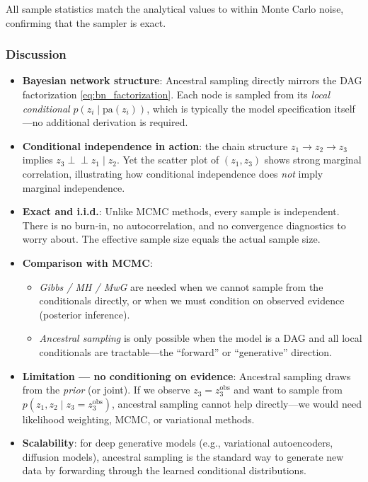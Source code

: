 \documentclass[12pt, a4paper]{article}
\begin{document}
All sample statistics match the analytical values to within
Monte Carlo noise, confirming that the sampler is exact.

\subsubsection{Discussion}

\begin{itemize}
    \item \textbf{Bayesian network structure}: Ancestral
          sampling directly mirrors the DAG factorization
          \eqref{eq:bn_factorization}.  Each node is sampled
          from its \emph{local conditional}
          $p(z_i \mid \mathrm{pa}(z_i))$, which is typically
          the model specification itself---no additional
          derivation is required.
    \item \textbf{Conditional independence in action}:
          the chain structure $z_1 \to z_2 \to z_3$ implies
          $z_3 \perp\!\!\perp z_1 \mid z_2$.  Yet the
          scatter plot of $(z_1, z_3)$ shows strong marginal
          correlation, illustrating how conditional independence
          does \emph{not} imply marginal independence.
    \item \textbf{Exact and i.i.d.}: Unlike MCMC methods,
          every sample is independent.  There is no burn-in,
          no autocorrelation, and no convergence diagnostics
          to worry about.  The effective sample size equals
          the actual sample size.
    \item \textbf{Comparison with MCMC}:
          \begin{itemize}
              \item \emph{Gibbs / MH / MwG} are needed when we
                    cannot sample from the conditionals
                    directly, or when we must condition on
                    observed evidence (posterior inference).
              \item \emph{Ancestral sampling} is only possible
                    when the model is a DAG and all local
                    conditionals are tractable---the
                    ``forward'' or ``generative'' direction.
          \end{itemize}
    \item \textbf{Limitation --- no conditioning on evidence}:
          Ancestral sampling draws from the \emph{prior}
          (or joint).  If we observe $z_3 = z_3^{\text{obs}}$
          and want to sample from
          $p(z_1, z_2 \mid z_3 = z_3^{\text{obs}})$, ancestral
          sampling cannot help directly---we would need
          likelihood weighting, MCMC, or variational methods.
    \item \textbf{Scalability}: for deep generative models
          (e.g., variational autoencoders, diffusion models),
          ancestral sampling is the standard way to generate
          new data by forwarding through the learned
          conditional distributions.
\end{itemize}
\end{document}
